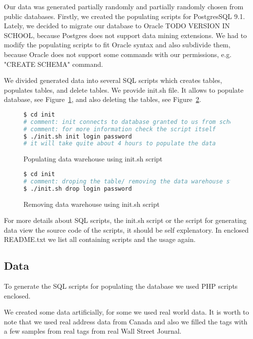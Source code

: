 
Our data was generated partially randomly and partially randomly chosen from public databases.
Firstly, we created the populating scripts for PostgresSQL 9.1. Lately, we decided to migrate
our database to Oracle TODO VERSION IN SCHOOL, because Postgres does not support data mining extensions.
We had to modify the populating scripts to fit Oracle syntax and also subdivide them,
because Oracle does not support some commands with our permissions, e.g. "CREATE SCHEMA" command.

We divided generated data into several SQL scripts which creates tables, populates tables, and delete tables.
We provide init.sh file. It allows to populate database, see Figure~\ref{l:ml1_init}, and also deleting the tables, see Figure~\ref{l:ml1_drop}.
\begin{figure}[!hbp]
\begin{lstlisting}[language=bash]
$ cd init
# comment: init connects to database granted to us from school
# comment: for more information check the script itself
$ ./init.sh init login password
# it will take quite about 4 hours to populate the data
\end{lstlisting}
\caption{Populating data warehouse using  init.sh script} \label{l:ml1_init}
\end{figure}

\begin{figure}[!hbp]
\begin{lstlisting}[language=bash]
$ cd init
# comment: droping the table/ removing the data warehouse still from init directory
$ ./init.sh drop login password
\end{lstlisting}
\caption{Removing data warehouse using  init.sh script} \label{l:ml1_drop}
\end{figure}

For more details about SQL scripts, the init.sh script or the script for generating data view the source code of the scripts, it should be self explenatory. In enclosed README.txt we list all containing scripts and the usage again.

\subsection*{Data}
To generate the SQL scripts for populating the database we used PHP scripts enclosed.

We created some data artificially, for some we used real world data.
It is worth to note that we used real address data from Canada and also we filled the tags with a few samples from real tags from real Wall Street Journal.


